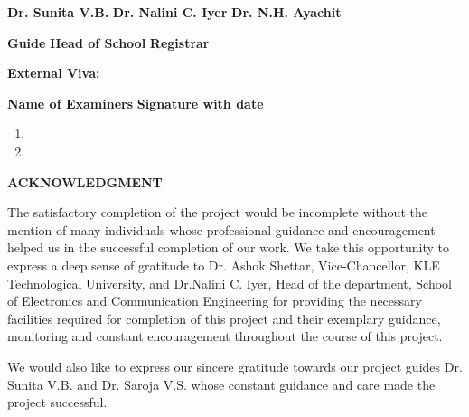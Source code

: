 \documentclass[12 pt]{report}
\begin{document}
\vspace{2cm}
\begin{small} \textbf{Dr. Sunita V.B.
}\hspace{2cm} \textbf {   Dr. Nalini C. Iyer } \hspace{2cm} {\textbf{Dr. N.H. Ayachit}} \linebreak
\end{small} 
\vspace{1cm} 
\hspace{1.5cm} \small{\textbf{Guide} \hspace{3.6cm}   \textbf{Head of School} \hspace{3.6cm}  \textbf{Registrar}}


\vspace{0.8cm} 

\begin{flushleft}
\textbf{External Viva: \\}
\end{flushleft}
\textbf{Name of Examiners} \hspace{8cm} \textbf{Signature with date}
\begin{enumerate}
\item  
\item  
\end{enumerate}

\newpage
\begin{center} 
\begin{Large}  
\textbf{ACKNOWLEDGMENT} 
\end{Large}
\end{center}



The satisfactory completion of the project would be incomplete without the mention of many individuals whose professional guidance and encouragement helped us in the successful completion of our work.
We take this opportunity to express a deep sense of gratitude to Dr. Ashok Shettar, Vice-Chancellor, KLE Technological University, and Dr.Nalini C. Iyer, Head of the department, School of Electronics and Communication Engineering for providing the necessary facilities required for completion of this project and their exemplary guidance, monitoring and constant encouragement throughout the course of this project.
\par We would also like to express our sincere gratitude towards our project guides Dr. Sunita V.B. and Dr. Saroja V.S.  whose constant guidance and care made the project successful.
\end{document}
